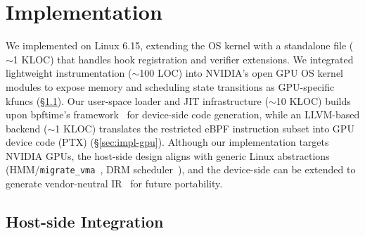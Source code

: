 
\section{Implementation}
\label{sec:implementation}

We implemented \sys on Linux 6.15, extending the OS kernel with a standalone file ($\sim$1 KLOC) that handles hook registration and verifier extensions.
We integrated lightweight instrumentation ($\sim$100 LOC) into NVIDIA's open GPU OS kernel modules to expose memory and scheduling state transitions as GPU-specific kfuncs (\S\ref{sec:impl-host}).
Our user-space loader and JIT infrastructure ($\sim$10 KLOC) builds upon bpftime's framework~\cite{bpftime} for device-side code generation, while an LLVM-based backend ($\sim$1 KLOC) translates the restricted \sys eBPF instruction subset into GPU device code (PTX) (\S\ref{sec:impl-gpu}).
Although our implementation targets NVIDIA GPUs, the host-side design aligns with generic Linux abstractions (HMM/\texttt{migrate\_vma}~\cite{rocm-gpu-memory,linux-gpusvm-doc}, DRM scheduler~\cite{drm-gpu-sched,amdgpu-userq-doc}), and the device-side can be extended to generate vendor-neutral IR~\cite{spirv-ir-rfc} for future portability.

\subsection{Host-side Integration}
\label{sec:impl-host}
